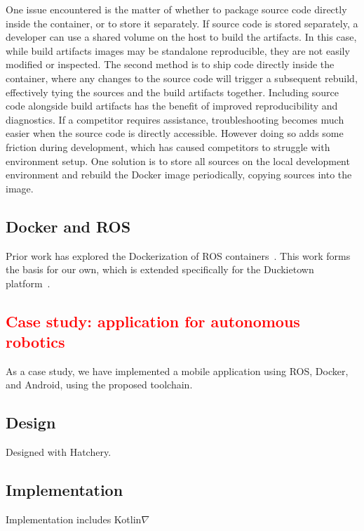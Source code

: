 \documentclass[12pt,initial,twoside,maitrise]{dms}
\newcommand{\rare}[1]{\textcolor{red}{#1}}
\numberwithin{equation}{section}
\numberwithin{table}{chapter}
\numberwithin{figure}{chapter}
\begin{document}
One issue encountered is the matter of whether to package source code directly inside the container, or to store it separately. If source code is stored separately, a developer can use a shared volume on the host to build the artifacts. In this case, while build artifacts images may be standalone reproducible, they are not easily modified or inspected. The second method is to ship code directly inside the container, where any changes to the source code will trigger a subsequent rebuild, effectively tying the sources and the build artifacts together. Including source code alongside build artifacts has the benefit of improved reproducibility and diagnostics. If a competitor requires assistance, troubleshooting becomes much easier when the source code is directly accessible. However doing so adds some friction during development, which has caused competitors to struggle with environment setup. One solution is to store all sources on the local development environment and rebuild the Docker image periodically, copying sources into the image.

\section{Docker and ROS}

Prior work has explored the Dockerization of ROS containers~\cite{white2017ros-docker}. This work forms the basis for our own, which is extended specifically for the Duckietown platform~\cite{paull2017duckietown}.

\rare{\chapter{Case study: application for autonomous robotics}\label{ch:case-study}}

As a case study, we have implemented a mobile application using ROS, Docker, and Android, using the proposed toolchain.

\section{Design}

Designed with Hatchery.

\section{Implementation}

Implementation includes Kotlin$\nabla$
\end{document}

